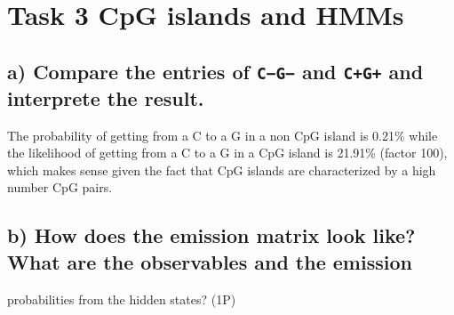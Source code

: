 \documentclass[
]{article}
\begin{document}
\hypertarget{task-3-cpg-islands-and-hmms}{%
\section{Task 3 CpG islands and
HMMs}\label{task-3-cpg-islands-and-hmms}}

\hypertarget{a-compare-the-entries-of-cg-and-cg-and-interprete-the-result.}{%
\subsection{\texorpdfstring{a) Compare the entries of \texttt{C−G−} and
\texttt{C+G+} and interprete the
result.}{a) Compare the entries of C−G− and C+G+ and interprete the result.}}\label{a-compare-the-entries-of-cg-and-cg-and-interprete-the-result.}}

The probability of getting from a C to a G in a non CpG island is 0.21\%
while the likelihood of getting from a C to a G in a CpG island is
21.91\% (factor 100), which makes sense given the fact that CpG islands
are characterized by a high number CpG pairs.

\hypertarget{b-how-does-the-emission-matrix-look-like-what-are-the-observables-and-the-emission}{%
\subsection{b) How does the emission matrix look like? What are the
observables and the
emission}\label{b-how-does-the-emission-matrix-look-like-what-are-the-observables-and-the-emission}}

probabilities from the hidden states? (1P)
\end{document}
